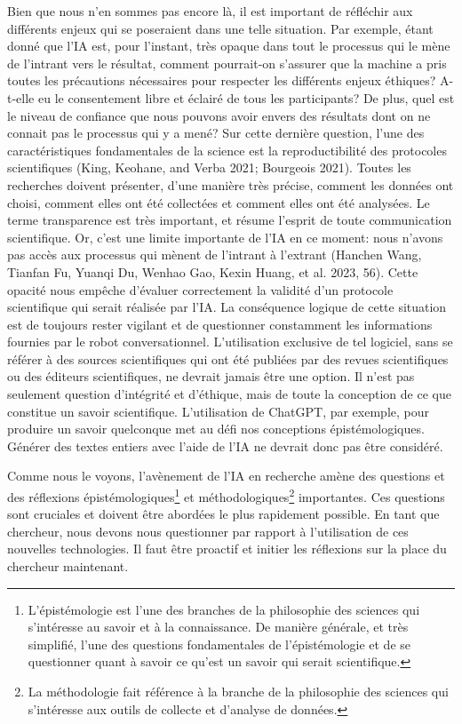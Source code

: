 \documentclass[
  letterpaper,
]{scrbook}
\begin{document}
Bien que nous n'en sommes pas encore là, il est important de réfléchir
aux différents enjeux qui se poseraient dans une telle situation. Par
exemple, étant donné que l'IA est, pour l'instant, très opaque dans tout
le processus qui le mène de l'intrant vers le résultat, comment
pourrait-on s'assurer que la machine a pris toutes les précautions
nécessaires pour respecter les différents enjeux éthiques? A-t-elle eu
le consentement libre et éclairé de tous les participants? De plus, quel
est le niveau de confiance que nous pouvons avoir envers des résultats
dont on ne connait pas le processus qui y a mené? Sur cette dernière
question, l'une des caractéristiques fondamentales de la science est la
reproductibilité des protocoles scientifiques (King, Keohane, and Verba
2021; Bourgeois 2021). Toutes les recherches doivent présenter, d'une
manière très précise, comment les données ont choisi, comment elles ont
été collectées et comment elles ont été analysées. Le terme transparence
est très important, et résume l'esprit de toute communication
scientifique. Or, c'est une limite importante de l'IA en ce moment: nous
n'avons pas accès aux processus qui mènent de l'intrant à l'extrant
(Hanchen Wang, Tianfan Fu, Yuanqi Du, Wenhao Gao, Kexin Huang, et al.
2023, 56). Cette opacité nous empêche d'évaluer correctement la validité
d'un protocole scientifique qui serait réalisée par l'IA. La conséquence
logique de cette situation est de toujours rester vigilant et de
questionner constamment les informations fournies par le robot
conversationnel. L'utilisation exclusive de tel logiciel, sans se
référer à des sources scientifiques qui ont été publiées par des revues
scientifiques ou des éditeurs scientifiques, ne devrait jamais être une
option. Il n'est pas seulement question d'intégrité et d'éthique, mais
de toute la conception de ce que constitue un savoir scientifique.
L'utilisation de ChatGPT, par exemple, pour produire un savoir
quelconque met au défi nos conceptions épistémologiques. Générer des
textes entiers avec l'aide de l'IA ne devrait donc pas être considéré.

Comme nous le voyons, l'avènement de l'IA en recherche amène des
questions et des réflexions épistémologiques\footnote{L'épistémologie
  est l'une des branches de la philosophie des sciences qui s'intéresse
  au savoir et à la connaissance. De manière générale, et très
  simplifié, l'une des questions fondamentales de l'épistémologie et de
  se questionner quant à savoir ce qu'est un savoir qui serait
  scientifique.} et méthodologiques\footnote{La méthodologie fait
  référence à la branche de la philosophie des sciences qui s'intéresse
  aux outils de collecte et d'analyse de données.} importantes. Ces
questions sont cruciales et doivent être abordées le plus rapidement
possible. En tant que chercheur, nous devons nous questionner par
rapport à l'utilisation de ces nouvelles technologies. Il faut être
proactif et initier les réflexions sur la place du chercheur maintenant.
\end{document}
